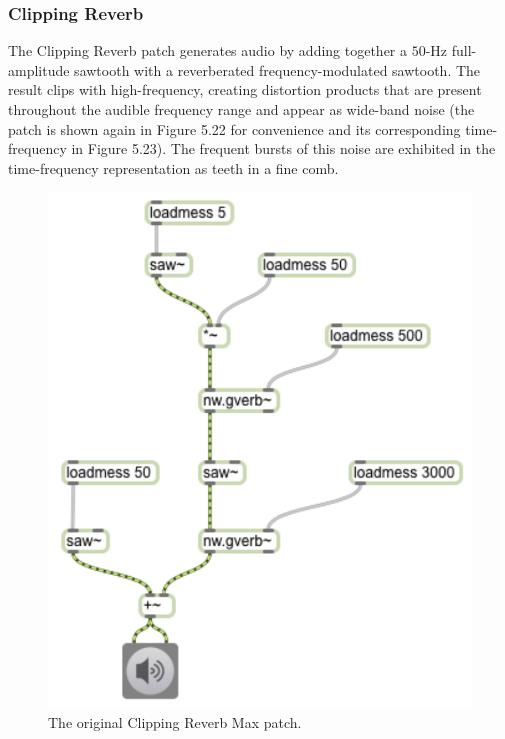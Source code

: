 \documentclass[a4paper,12pt]{report} 	%
\numberwithin{figure}{chapter}
\numberwithin{table}{chapter}
\numberwithin{equation}{chapter}
\begin{document}
\begin{flushleft}
\clearpage
\subsubsection{Clipping Reverb}
The Clipping Reverb patch generates audio by adding together a $50$-Hz full-amplitude sawtooth with a reverberated frequency-modulated sawtooth. The result clips with high-frequency, creating distortion products that are present throughout the audible frequency range and appear as wide-band noise (the patch is shown again in Figure 5.22 for convenience and its corresponding time-frequency in Figure 5.23). The frequent bursts of this noise are exhibited in the time-frequency representation as teeth in a fine comb.
\begin{figure}[h!]
\begin{center}
\includegraphics[scale=0.8]{ClippingReverbSaw}
\caption[Original Clipping Reverb Max Patch]{The original Clipping Reverb Max patch.}
\end{center}
\end{figure}
\\
\begin{figure}[h!]

\end{figure}
\end{flushleft}
\end{document}
